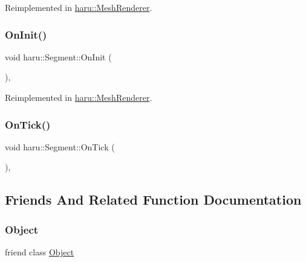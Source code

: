 Reimplemented in \mbox{\hyperlink{classharu_1_1_mesh_renderer_ac927c9cc1d392ca8305ca995ddc0b7a6}{haru\+::\+Mesh\+Renderer}}.

\mbox{\label{classharu_1_1_segment_adc41c8e5769e0057ade94abf669c6dbc}} 
\subsubsection{\texorpdfstring{On\+Init()}{OnInit()}}
{\footnotesize\ttfamily void haru\+::\+Segment\+::\+On\+Init (\begin{DoxyParamCaption}{ }\end{DoxyParamCaption})\hspace{0.3cm}{\ttfamily [private]}, {\ttfamily [virtual]}}



Reimplemented in \mbox{\hyperlink{classharu_1_1_mesh_renderer_a5a6a5b945fc7560d166e9d16058aec53}{haru\+::\+Mesh\+Renderer}}.

\mbox{\label{classharu_1_1_segment_ad8b0861ccbf13afe613ff07622c1507b}} 
\subsubsection{\texorpdfstring{On\+Tick()}{OnTick()}}
{\footnotesize\ttfamily void haru\+::\+Segment\+::\+On\+Tick (\begin{DoxyParamCaption}{ }\end{DoxyParamCaption})\hspace{0.3cm}{\ttfamily [private]}, {\ttfamily [virtual]}}



\subsection{Friends And Related Function Documentation}
\mbox{\label{classharu_1_1_segment_a0720b5f434e636e22a3ed34f847eec57}} 
\subsubsection{\texorpdfstring{Object}{Object}}
{\footnotesize\ttfamily friend class \mbox{\hyperlink{classharu_1_1_object}{Object}}\hspace{0.3cm}{\ttfamily [friend]}}




